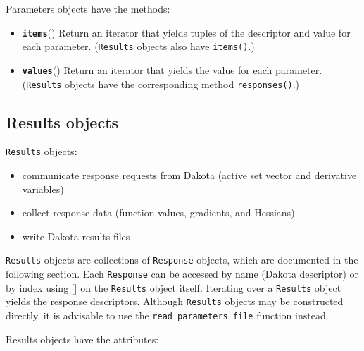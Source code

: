 Parameters objects have the methods:

\begin{itemize}
  \item{}
	  \label{index:dakota.interfacing.Parameters.items}\textbf{\texttt{items}}{()}{}
          Return an iterator that yields tuples of the descriptor and value for each parameter. ({\tt Results} objects also have {\tt items()}.)

  \item{}
	  \label{index:dakota.interfacing.Parameters.values}\textbf{\texttt{values}}{()}{}
          Return an iterator that yields the value for each parameter. ({\tt Results} objects have the corresponding method {\tt responses()}.)

\end{itemize}

\subsection{Results objects}

{\tt Results} objects:
\begin{itemize}

  \item communicate response requests from Dakota (active set vector and derivative variables)
  \item collect response data (function values, gradients, and Hessians)
  \item write Dakota results files
\end{itemize}

{\tt Results} objects are collections of {\tt Response} objects, which are documented in the following section. Each {\tt Response} can be accessed by name (Dakota descriptor) or by index using {[}{]} on the {\tt Results} object itself. Iterating over a {\tt Results} object yields the response descriptors. Although {\tt Results} objects may be constructed directly, it is advisable to use the {\tt read\_parameters\_file} function instead.

Results objects have the attributes:

